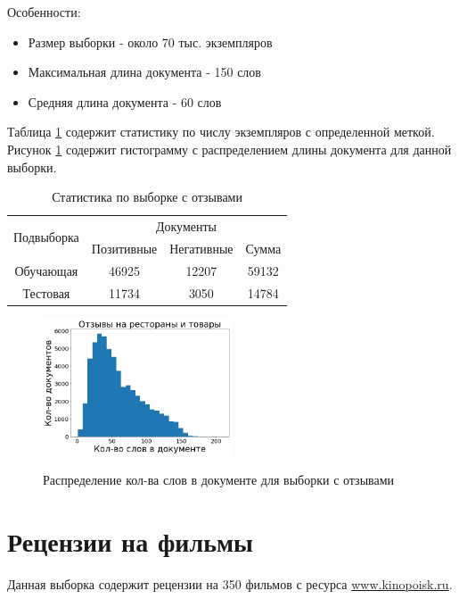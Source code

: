 Особенности:
\begin{itemize}
	\item Размер выборки - около 70 тыс. экземпляров
	\item Максимальная длина документа - 150 слов
	\item Средняя длина документа - 60 слов
\end{itemize}

Таблица \ref{tab:reviews} содержит статистику по числу экземпляров с определенной меткой. Рисунок \ref{fig:hist_reviews} содержит гистограмму с распределением длины документа для данной выборки.

\begin{table}[H]
\centering
\caption{Статистика по выборке с отзывами}
\label{tab:reviews}
\begin{tabular}{|c|c|c|c|}
\hline
\multirow{2}{*}{Подвыборка} & \multicolumn{3}{c|}{Документы}  \\ \cline{2-4} 
                            & Позитивные & Негативные & Сумма \\ \hline
Обучающая                   & 46925        & 12207       & 59132 \\ \hline
Тестовая                    & 11734        & 3050        & 14784  \\ \hline
\end{tabular}
\end{table}

\begin{figure}[H]
\centering
\caption{Распределение кол-ва слов в документе для выборки с отзывами}
\includegraphics[width=0.5\textwidth]{images/hist_reviews.png}
\label{fig:hist_reviews}
\end{figure}
\section{Рецензии на фильмы}
Данная выборка содержит рецензии на 350 фильмов с ресурса \url{www.kinopoisk.ru}.

